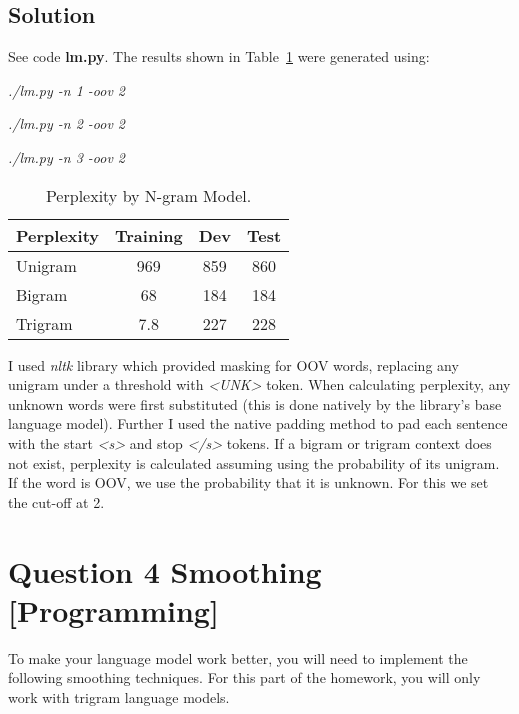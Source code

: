 \documentclass[11pt]{article}
\begin{document}
\subsection*{Solution}

See code \textbf{lm.py}. The results shown in Table~\ref{tbl:ngram} were generated using:

\bigskip

\textit{./lm.py -n 1 -oov 2}
	
\textit{./lm.py -n 2 -oov 2}
	
\textit{./lm.py -n 3 -oov 2}


\begin{table}
	\begin{center}
		\begin{tabular}{l|c|c|c}
		\textbf{Perplexity} & \textbf{Training} & \textbf{Dev} & \textbf{Test} \\
		\hline
		Unigram & 969 & 859 & 860 \\
		Bigram & 68 & 184 & 184 \\
		Trigram & 7.8 & 227 & 228 \\
		\end{tabular}
		\caption{Perplexity by N-gram Model.}
		\label{tbl:ngram}
	\end{center}
\end{table}

\bigskip

I used \textit{nltk} library which provided masking for OOV words, replacing any unigram under a threshold with
 \textit{<UNK>} token. When calculating perplexity, any unknown words were first substituted (this is done 
 natively by the library's base language model). Further I used the native padding method to pad each sentence 
 with the start \textit{<s>} and stop \textit{</s>} tokens. If a bigram or trigram context does not exist, perplexity is 
 calculated assuming using the probability of its unigram. If the word is OOV, we use the probability that it is 
 unknown. For this we set the cut-off at 2.  

\section*{Question 4 Smoothing [Programming]}

To make your language model work better, you will need to implement the following smoothing techniques. For this part of the homework, you will only work with trigram language models.
\end{document}
